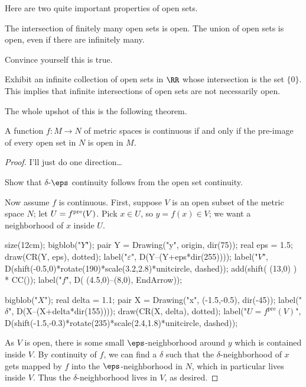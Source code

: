 Here are two quite important properties of open sets.
\begin{proposition}
	\listhack
	\begin{enumerate}[(a)]
		\ii The intersection of finitely many open sets is open.
		\ii The union of open sets is open, even if there are infinitely many.
	\end{enumerate}
\end{proposition}
\begin{ques}
	Convince yourself this is true.
\end{ques}
\begin{exercise}
	Exhibit an infinite collection of open sets in $\RR$
	whose intersection is the set $\{0\}$.
	This implies that infinite intersections of open sets are not necessarily open.
\end{exercise}

The whole upshot of this is the following theorem.
\begin{theorem}
	A function $f : M \to N$ of metric spaces is continuous
	if and only if the pre-image of every open set in $N$ is open in $M$.
\end{theorem}
\begin{proof}
	I'll just do one direction\dots
	\begin{exercise}
		Show that $\delta$-$\eps$ continuity follows from
		the open set continuity.
	\end{exercise}
	Now assume $f$ is continuous.
	First, suppose $V$ is an open subset of the metric space $N$;
	let $U = f^{\text{pre}}(V)$. Pick $x \in U$, so $y = f(x) \in V$; we want a neighborhood of $x$ inside $U$.

	\begin{center}
		\begin{asy}
			size(12cm);
			bigblob("$Y$");
			pair Y = Drawing("y", origin, dir(75));
			real eps = 1.5;
			draw(CR(Y, eps), dotted);
			label("$\varepsilon$", D(Y--(Y+eps*dir(255))));
			label("$V$",
				D(shift(-0.5,0)*rotate(190)*scale(3.2,2.8)*unitcircle, dashed));
			add(shift( (13,0) ) * CC());
			label("$f$", D( (4.5,0)--(8,0), EndArrow));

			bigblob("$X$");
			real delta = 1.1;
			pair X = Drawing("x", (-1.5,-0.5), dir(-45));
			label("$\delta$", D(X--(X+delta*dir(155))));
			draw(CR(X, delta), dotted);
			label("$U = f^{\text{pre}}(V)$",
				D(shift(-1.5,-0.3)*rotate(235)*scale(2.4,1.8)*unitcircle, dashed));
		\end{asy}
	\end{center}

	As $V$ is open, there is some small $\eps$-neighborhood around $y$
	which is contained inside $V$.
	By continuity of $f$, we can find a $\delta$ such that the $\delta$-neighborhood
	of $x$ gets mapped by $f$ into the $\eps$-neighborhood in $N$, 
	which in particular lives inside $V$.
	Thus the $\delta$-neighborhood lives in $V$, as desired.
\end{proof}

